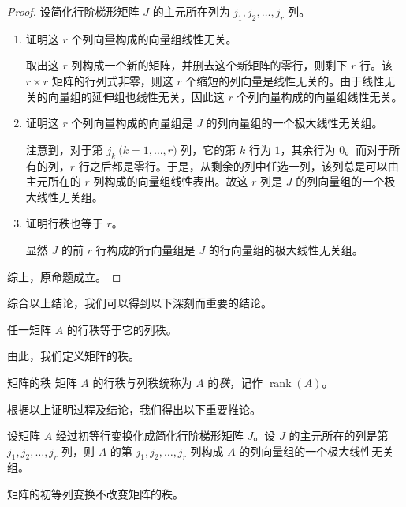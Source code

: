\begin{proof}
	设简化行阶梯形矩阵 $J$ 的主元所在列为 $j_1, j_2, \ldots, j_r$ 列。

	\begin{enumerate}
		\item 证明这 $r$ 个列向量构成的向量组线性无关。

		取出这 $r$ 列构成一个新的矩阵，并删去这个新矩阵的零行，则剩下 $r$ 行。该 $r \times r$ 矩阵的行列式非零，则这 $r$ 个缩短的列向量是线性无关的。由于线性无关的向量组的延伸组也线性无关，因此这 $r$ 个列向量构成的向量组线性无关。

		\item 证明这 $r$ 个列向量构成的向量组是 $J$ 的列向量组的一个极大线性无关组。

		注意到，对于第 $j_k \pod{k = 1, \ldots, r}$ 列，它的第 $k$ 行为 $1$，其余行为 $0$。而对于所有的列，$r$ 行之后都是零行。于是，从剩余的列中任选一列，该列总是可以由主元所在的 $r$ 列构成的向量组线性表出。故这 $r$ 列是 $J$ 的列向量组的一个极大线性无关组。

		\item 证明行秩也等于 $r$。

		显然 $J$ 的前 $r$ 行构成的行向量组是 $J$ 的行向量组的极大线性无关组。
	\end{enumerate}

	综上，原命题成立。
\end{proof}

综合以上结论，我们可以得到以下深刻而重要的结论。

\begin{theorem}
	任一矩阵 $A$ 的行秩等于它的列秩。
\end{theorem}

由此，我们定义矩阵的秩。

\begin{definition}{矩阵的秩}
	矩阵 $A$ 的行秩与列秩统称为 $A$ 的\emph{秩}，记作 $\operatorname{rank}(A)$。
\end{definition}

根据以上证明过程及结论，我们得出以下重要推论。

\begin{theorem}
	设矩阵 $A$ 经过初等行变换化成简化行阶梯形矩阵 $J$。设 $J$ 的主元所在的列是第 $j_1, j_2, \ldots, j_r$ 列，则 $A$ 的第 $j_1, j_2, \ldots, j_r$ 列构成 $A$ 的列向量组的一个极大线性无关组。
\end{theorem}

\begin{theorem}
	矩阵的初等列变换不改变矩阵的秩。
\end{theorem}

